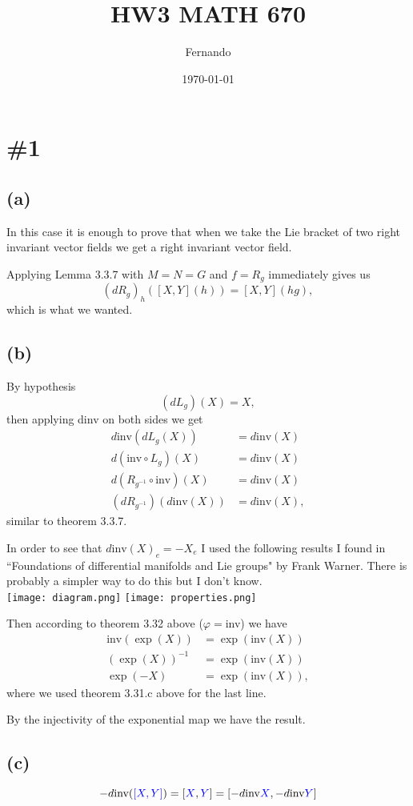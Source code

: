 \documentclass{article}
\begin{document}
\newcommand{\R}{\mathbb{R}}

\title{HW3 MATH 670}
\author{Fernando}
\date{\today}
\maketitle

\section*{\#1}
\subsection*{(a)}
In this case it is enough to prove that when we take the Lie bracket of two
right invariant vector fields we get a right invariant vector field.

Applying Lemma 3.3.7 with $M=N=G$ and $f=R_g$ immediately gives us
\[
  (dR_g)_h([X,Y](h))=[X,Y](hg),
\]
which is what we wanted.
\subsection*{(b)}
By hypothesis
\[
  (dL_g)(X)=X,
\]
then applying dinv on both sides we get
\begin{align*}
  d\text{inv}(dL_g(X))&=d\text{inv}(X)\\
  d(\text{inv}\circ L_g)(X)&=d\text{inv}(X)\\
  d(R_{g^{-1}}\circ \text{inv})(X)&=d\text{inv}(X)\\
  (dR_{g^{-1}})(d\text{inv}(X))&=d\text{inv}(X),
\end{align*}
similar to theorem 3.3.7.

In order to see that $d\text{inv}(X)_e=-X_e$ I used the following results I found in
``Foundations of differential manifolds and Lie groups" by Frank Warner. There is
probably a simpler way to do this but I don't know.\\
\texttt{[image: diagram.png]}
\texttt{[image: properties.png]}

Then according to theorem 3.32 above ($\varphi=$inv) we have
\begin{align*}
  \text{inv}(\exp(X))&=\exp(\text{inv}(X))\\
  (\exp(X))^{-1}&=\exp(\text{inv}(X))\\
  \exp(-X)&=\exp(\text{inv}(X)),
\end{align*}
where we used theorem 3.31.c above for the last line.

By the injectivity of the exponential map we have the result.
\subsection*{(c)}
\[
  -d\text{inv}({\color{blue}[X,Y]})=[{\color{blue}X},{\color{blue}Y}]=[-d\text{inv}{\color{blue}X},-d\text{inv}{\color{blue}Y}]
\]
\end{document}
